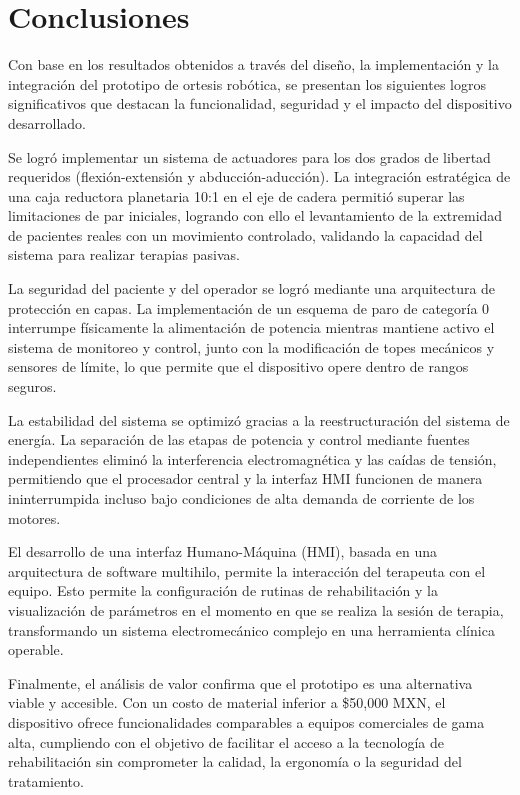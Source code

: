 
\chapter{Conclusiones}
Con base en los resultados obtenidos a través del diseño, la implementación y la integración del prototipo de ortesis robótica, se presentan los siguientes logros significativos que destacan la funcionalidad, seguridad y el impacto del dispositivo desarrollado.

Se logró implementar un sistema de actuadores para los dos grados de libertad requeridos (flexión-extensión y abducción-aducción). La integración estratégica de una caja reductora planetaria 10:1 en el eje de cadera permitió superar las limitaciones de par iniciales, logrando con ello el levantamiento de la extremidad de pacientes reales con un movimiento controlado, validando la capacidad del sistema para realizar terapias pasivas.

La seguridad del paciente y del operador se logró mediante una arquitectura de protección en capas. La implementación de un esquema de paro de categoría 0 interrumpe físicamente la alimentación de potencia mientras mantiene activo el sistema de monitoreo y control, junto con la modificación de topes mecánicos y sensores de límite, lo que permite que el dispositivo opere dentro de rangos seguros.

La estabilidad del sistema se optimizó gracias a la reestructuración del sistema de energía. La separación de las etapas de potencia y control mediante fuentes independientes eliminó la interferencia electromagnética y las caídas de tensión, permitiendo que el procesador central y la interfaz HMI funcionen de manera ininterrumpida incluso bajo condiciones de alta demanda de corriente de los motores.

El desarrollo de una interfaz Humano-Máquina (HMI), basada en una arquitectura de software multihilo, permite la interacción del terapeuta con el equipo. Esto permite la configuración de rutinas de rehabilitación y la visualización de parámetros en el momento en que se realiza la sesión de terapia, transformando un sistema electromecánico complejo en una herramienta clínica operable.

Finalmente, el análisis de valor confirma que el prototipo es una alternativa viable y accesible. Con un costo de material inferior a \$50,000 MXN, el dispositivo ofrece funcionalidades comparables a equipos comerciales de gama alta, cumpliendo con el objetivo de facilitar el acceso a la tecnología de rehabilitación sin comprometer la calidad, la ergonomía o la seguridad del tratamiento.

